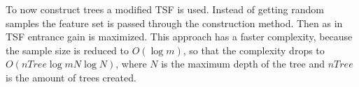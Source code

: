 To now construct trees a modified TSF is used. Instead 
of getting random samples the feature set is passed through the construction method.
Then as in TSF entrance gain is maximized. This approach has a faster complexity, because 
the sample size is reduced to $O(\log m)$, so that the
complexity drops to $O(nTree \log m N \log N)$, where $N$ is the maximum depth of the 
tree and $nTree$ is the amount of trees created. %